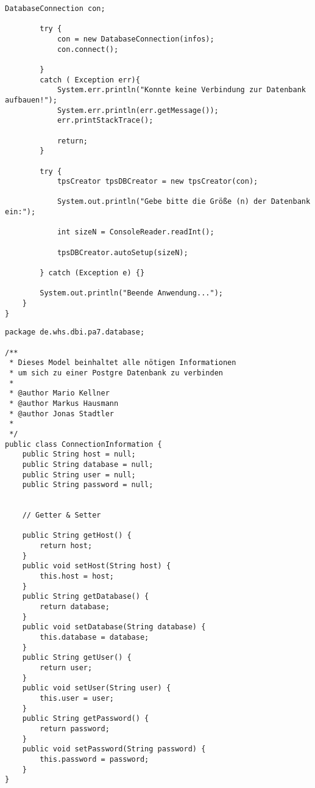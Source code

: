 \begin{lstlisting}[caption={Main}, label={lst:mainv1}]
		DatabaseConnection con;
		
		try {
			con = new DatabaseConnection(infos);
			con.connect();
			
		}
		catch ( Exception err){
			System.err.println("Konnte keine Verbindung zur Datenbank aufbauen!");
			System.err.println(err.getMessage());
			err.printStackTrace();
			
			return;
		}
		
		try {
			tpsCreator tpsDBCreator = new tpsCreator(con);
		
			System.out.println("Gebe bitte die Größe (n) der Datenbank ein:");
			
			int sizeN = ConsoleReader.readInt();
			
			tpsDBCreator.autoSetup(sizeN);
			
		} catch (Exception e) {}
		
		System.out.println("Beende Anwendung...");		
	}
}
\end{lstlisting}


\begin{lstlisting}[caption={ConnectionInformation}, label={lst:civ1}]
package de.whs.dbi.pa7.database;

/**
 * Dieses Model beinhaltet alle nötigen Informationen 
 * um sich zu einer Postgre Datenbank zu verbinden
 * 
 * @author Mario Kellner
 * @author Markus Hausmann
 * @author Jonas Stadtler
 *
 */
public class ConnectionInformation {
	public String host = null;
	public String database = null;
	public String user = null;
	public String password = null;
	
	
	// Getter & Setter
	
	public String getHost() {
		return host;
	}
	public void setHost(String host) {
		this.host = host;
	}
	public String getDatabase() {
		return database;
	}
	public void setDatabase(String database) {
		this.database = database;
	}
	public String getUser() {
		return user;
	}
	public void setUser(String user) {
		this.user = user;
	}
	public String getPassword() {
		return password;
	}
	public void setPassword(String password) {
		this.password = password;
	}
}
\end{lstlisting}


